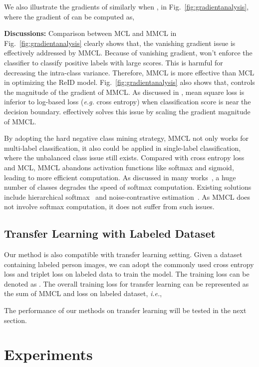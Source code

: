 \documentclass[10pt,twocolumn,letterpaper]{article}
\begin{document}
We also illustrate the gradients of  similarly when , in Fig.~\ref{fig:gradientanalysis}, where the gradient of  can be computed as,


\textbf{Discussions:} Comparison between MCL and MMCL in Fig.~\ref{fig:gradientanalysis} clearly shows that, the vanishing gradient issue is effectively addressed by MMCL. Because of vanishing gradient,  won't enforce the classifier to classify positive labels with large scores. This is harmful for decreasing the intra-class variance. Therefore, MMCL is more effective than MCL in optimizing the ReID model. Fig.~\ref{fig:gradientanalysis} also shows that,  controls the magnitude of the gradient of MMCL. As discussed in \cite{NIPS2018_8094}, mean square loss is inferior to log-based loss (\emph{e.g.} cross entropy) when classification score is near the decision boundary.  effectively solves this issue by scaling the gradient magnitude of MMCL.

By adopting the hard negative class mining strategy, MMCL not only works for multi-label classification, it also could be applied in single-label classification, where the unbalanced class issue still exists. Compared with cross entropy loss and MCL, MMCL abandons activation functions like softmax and sigmoid, leading to more efficient computation. As discussed in many works~\cite{morin2005hierarchical, gutmann2010noise}, a huge number of classes degrades the speed of softmax computation. Existing solutions include hierarchical softmax~\cite{morin2005hierarchical} and noise-contrastive estimation~\cite{gutmann2010noise}. As MMCL does not involve softmax computation, it does not suffer from such issues.

\subsection{Transfer Learning with Labeled Dataset}\label{section:transfer}
Our method is also compatible with transfer learning setting. Given a dataset containing labeled person images, we can adopt the commonly used cross entropy loss and triplet loss on labeled data to train the model. The training loss can be denoted as . The overall training loss for transfer learning can be represented as the sum of MMCL and loss on labeled dataset, \emph{i.e.},

The performance of our methods on transfer learning will be tested in the next section.

\section{Experiments}
\vspace{-1mm}
\end{document}
